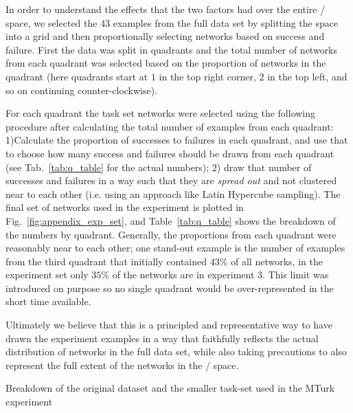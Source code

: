 In order to understand the effects that the two \famsec{} factors had over the entire \xQ{}/\xO{} space, we selected the 43 examples from the full data set by splitting the space into a grid and then proportionally selecting networks based on success and failure. First the data was split in quadrants and the total number of networks from each quadrant was selected based on the proportion of networks in the quadrant (here quadrants start at $1$ in the top right corner, $2$ in the top left, and so on continuing counter-clockwise).

For each quadrant the task set networks were selected using the following procedure after calculating the total number of examples from each quadrant: 1)Calculate the proportion of successes to failures in each quadrant, and use that to choose how many success and failures should be drawn from each quadrant (see Tab.~\ref{tab:q_table} for the actual numbers); 2) draw that number of successes and failures in a way such that they are \emph{spread out} and not clustered near to each other (i.e. using an approach like Latin Hypercube sampling). The final set of networks used in the experiment is plotted in Fig.~\ref{fig:appendix_exp_set}, and Table~\ref{tab:q_table} shows the breakdown of the numbers by quadrant. Generally, the proportions from each quadrant were reasonably near to each other; one stand-out example is the number of examples from the third quadrant that initially contained $43\%$ of all networks, in the experiment set only $35\%$ of the networks are in experiment 3. This limit was introduced on purpose so no single quadrant would be over-represented in the short time available.

Ultimately we believe that this is a principled and representative way to have drawn the experiment examples in a way that faithfully reflects the actual distribution of networks in the full data set, while also taking precautions to also represent the full extent of the networks in the \xQ/\xO{} space.


\begin{table}
    \centering
    \caption{Breakdown of the original dataset and the smaller task-set used in the MTurk experiment}
    \label{tab:q_table}
    
\end{table}
